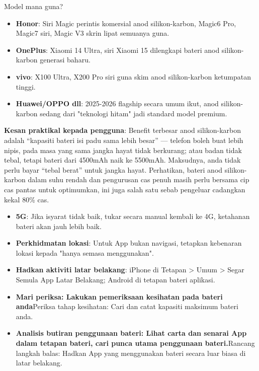 \begin{tcbinfo}{Model mana guna?}
\begin{itemize}
  \item \textbf{Honor}: Siri Magic perintis komersial anod silikon-karbon, Magic6 Pro, Magic7 siri, Magic V3 skrin lipat semuanya guna.
  \item \textbf{OnePlus}: Xiaomi 14 Ultra, siri Xiaomi 15 dilengkapi bateri anod silikon-karbon generasi baharu.
  \item \textbf{vivo}: X100 Ultra, X200 Pro siri guna skim anod silikon-karbon ketumpatan tinggi.
  \item \textbf{Huawei/OPPO dll}: 2025-2026 flagship secara umum ikut, anod silikon-karbon sedang dari "teknologi hitam" jadi standard model premium.
\end{itemize}

\end{tcbinfo}

\textbf{Kesan praktikal kepada pengguna}: Benefit terbesar anod silikon-karbon adalah “kapasiti bateri isi padu sama lebih besar” — telefon boleh buat lebih nipis, pada masa yang sama jangka hayat tidak berkurang; atau badan tidak tebal, tetapi bateri dari 4500mAh naik ke 5500mAh. Maksudnya, anda tidak perlu bayar “tebal berat” untuk jangka hayat. Perhatikan, bateri anod silikon-karbon dalam suhu rendah dan pengurusan cas penuh masih perlu bersama cip cas pantas untuk optimumkan, ini juga salah satu sebab pengeluar cadangkan kekal 80\% cas.


\begin{itemize}
  \item \textbf{5G}: Jika isyarat tidak baik, tukar secara manual kembali ke 4G, ketahanan bateri akan jauh lebih baik.
  \item \textbf{Perkhidmatan lokasi}: Untuk App bukan navigasi, tetapkan kebenaran lokasi kepada "hanya semasa menggunakan".
  \item \textbf{Hadkan aktiviti latar belakang}: iPhone di Tetapan > Umum > Segar Semula App Latar Belakang; Android di tetapan bateri aplikasi.
  \item \textbf{Mari periksa: Lakukan pemeriksaan kesihatan pada bateri anda}Periksa tahap kesihatan: Cari dan catat kapasiti maksimum bateri anda.
  \item \textbf{Analisis butiran penggunaan bateri: Lihat carta dan senarai App dalam tetapan bateri, cari punca utama penggunaan bateri.}Rancang langkah balas: Hadkan App yang menggunakan bateri secara luar biasa di latar belakang.
\end{itemize}

